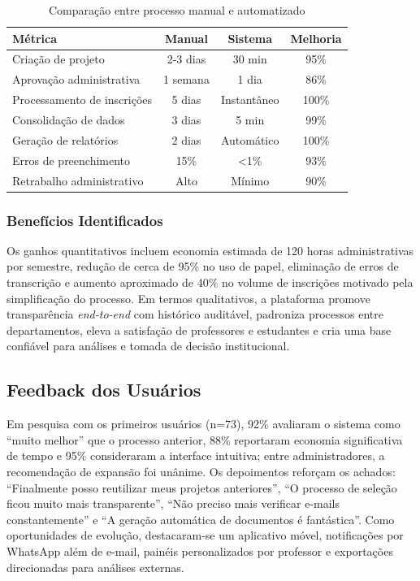 \documentclass[portuguese]{sbc2025}%
\begin{document}
\begin{table}[t]
  \centering
  \caption{Comparação entre processo manual e automatizado}
  \label{tab:comparacao}
  \begin{adjustbox}{max width=\textwidth}
    \begin{tabular}{|l|c|c|c|}
      \hline
      \textbf{Métrica} & \textbf{Manual} & \textbf{Sistema} & \textbf{Melhoria} \\
      \hline
      Criação de projeto & 2-3 dias & 30 min & 95\% \\
      Aprovação administrativa & 1 semana & 1 dia & 86\% \\
      Processamento de inscrições & 5 dias & Instantâneo & 100\% \\
      Consolidação de dados & 3 dias & 5 min & 99\% \\
      Geração de relatórios & 2 dias & Automático & 100\% \\
      Erros de preenchimento & 15\% & <1\% & 93\% \\
      Retrabalho administrativo & Alto & Mínimo & 90\% \\
      \hline
    \end{tabular}
  \end{adjustbox}
\end{table}

\subsubsection{Benefícios Identificados}

Os ganhos quantitativos incluem economia estimada de 120 horas administrativas por semestre, redução de cerca de 95\% no uso de papel, eliminação de erros de transcrição e aumento aproximado de 40\% no volume de inscrições motivado pela simplificação do processo. Em termos qualitativos, a plataforma promove transparência \textit{end-to-end} com histórico auditável, padroniza processos entre departamentos, eleva a satisfação de professores e estudantes e cria uma base confiável para análises e tomada de decisão institucional.

\subsection{Feedback dos Usuários}

Em pesquisa com os primeiros usuários (n=73), 92\% avaliaram o sistema como “muito melhor” que o processo anterior, 88\% reportaram economia significativa de tempo e 95\% consideraram a interface intuitiva; entre administradores, a recomendação de expansão foi unânime. Os depoimentos reforçam os achados: “Finalmente posso reutilizar meus projetos anteriores”, “O processo de seleção ficou muito mais transparente”, “Não preciso mais verificar e-mails constantemente” e “A geração automática de documentos é fantástica”. Como oportunidades de evolução, destacaram-se um aplicativo móvel, notificações por WhatsApp além de e-mail, painéis personalizados por professor e exportações direcionadas para análises externas.
\end{document}
